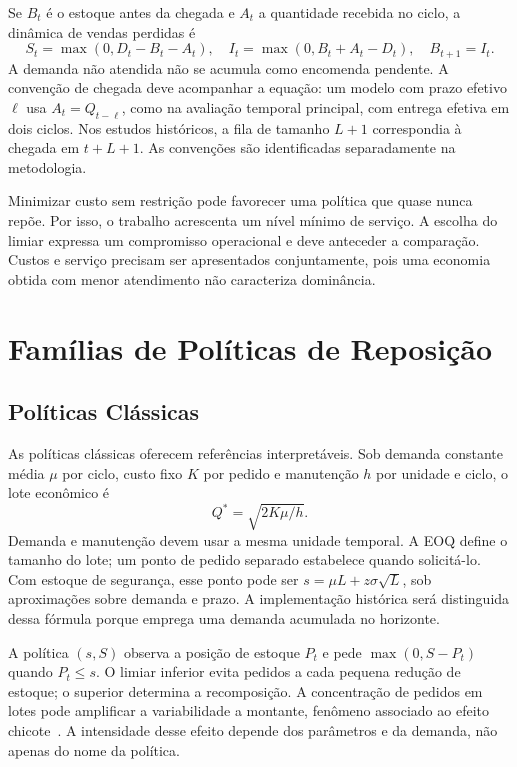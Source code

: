 Se $B_t$ é o estoque antes da chegada e $A_t$ a quantidade recebida no ciclo, a dinâmica de vendas perdidas é
\begin{equation}
S_t=\max(0,D_t-B_t-A_t),\quad
I_t=\max(0,B_t+A_t-D_t),\quad B_{t+1}=I_t.
\label{eq:balance}
\end{equation}
A demanda não atendida não se acumula como encomenda pendente. A convenção de chegada deve acompanhar a equação: um modelo com prazo efetivo $\ell$ usa $A_t=Q_{t-\ell}$, como na avaliação temporal principal, com entrega efetiva em dois ciclos. Nos estudos históricos, a fila de tamanho $L+1$ correspondia à chegada em $t+L+1$. As convenções são identificadas separadamente na metodologia.

Minimizar custo sem restrição pode favorecer uma política que quase nunca repõe. Por isso, o trabalho acrescenta um nível mínimo de serviço. A escolha do limiar expressa um compromisso operacional e deve anteceder a comparação. Custos e serviço precisam ser apresentados conjuntamente, pois uma economia obtida com menor atendimento não caracteriza dominância.

\section{Famílias de Políticas de Reposição}
\label{sec:politicas_reposicao}
\subsection{Políticas Clássicas}
\label{sec:politicas_classicas}

As políticas clássicas oferecem referências interpretáveis. Sob demanda constante média $\mu$ por ciclo, custo fixo $K$ por pedido e manutenção $h$ por unidade e ciclo, o lote econômico é
\[
Q^*=\sqrt{2K\mu/h}.
\]
Demanda e manutenção devem usar a mesma unidade temporal. A EOQ define o tamanho do lote; um ponto de pedido separado estabelece quando solicitá-lo. Com estoque de segurança, esse ponto pode ser $s=\mu L+z\sigma\sqrt L$, sob aproximações sobre demanda e prazo. A implementação histórica será distinguida dessa fórmula porque emprega uma demanda acumulada no horizonte.

A política $(s,S)$ observa a posição de estoque $P_t$ e pede $\max(0,S-P_t)$ quando $P_t\leq s$. O limiar inferior evita pedidos a cada pequena redução de estoque; o superior determina a recomposição. A concentração de pedidos em lotes pode amplificar a variabilidade a montante, fenômeno associado ao efeito chicote~\citep{LeePadmanabhanWhang1997Bullwhip}. A intensidade desse efeito depende dos parâmetros e da demanda, não apenas do nome da política.


